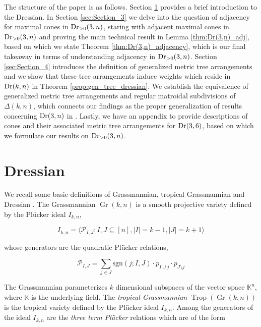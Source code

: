 \documentclass[12pt]{article}
\DeclareMathOperator{\Dr}{\rm Dr}
\DeclareMathOperator{\Trop}{Trop}
\theoremstyle{plain}
\theoremstyle{definition}
\numberwithin{subcase}{case}
\DeclareMathOperator{\Gr}{Gr}
\begin{document}
 
The structure of the paper is as follows. Section \ref{sec:Section_2} provides a brief introduction to the Dressian. In Section \ref{sec:Section_3} we delve into the question of adjacency for maximal cones in $\Dr_{>0}(3,n)$, staring with  adjacent maximal cones in $\Dr_{>0}(3,n)$ and proving the main technical result in Lemma \ref{thm:Dr(3,n)_adj}, based on which we state Theorem \ref{thm:Dr(3,n)_adjacency}, which is our final takeaway in terms of understanding adjacency in $\Dr_{>0}(3,n)$. Section \ref{sec:Section_4} introduces the definition of generalized metric tree arrangements and we show that these tree arrangements induce weights which reside in $\Dr(k,n)$ in Theorem \ref{prop:gen_tree_dressian}. We establish the equivalence of generalized metric tree arrangements and regular matroidal subdivisions of $\Delta(k,n)$, which connects our findings as the proper generalization of results concerning $\Dr(3,n)$ in \cite{herrmann2009draw}. Lastly, we have an appendix to provide descriptions of cones and their associated metric tree arrangements for $\Dr(3,6)$, based on which we formulate our results on $\Dr_{>0}(3,n)$. 


\section{Dressian}\label{sec:Section_2}


We recall some basic definitions of Grassmannian, tropical Grassmannian and Dressian \cite{maclagan2021}.
The Grassmannian $\Gr(k,n)$ is a smooth projective variety defined by the Pl\"ucker ideal $I_{k,n}$,

\[ I _{k,n} = \langle  \mathcal{P}_{I,J} : I,J \subseteq [n], |I| = k-1, |J| = k+1 \rangle  \]

whose generators are the quadratic Pl\"ucker relations,

\[ \mathcal{P}_{I,J} = \sum_{j \in J} \text{sgn}(j;I,J) \cdot p_{I \cup j} \cdot p_{J \setminus j }  \]

The Grassmannian parameterizes $k$ dimensional subspaces of the vector space $\mathbb{K}^{n}$, where $\mathbb{K}$ is the underlying field. The \emph{tropical Grassmannian} $\Trop(\Gr(k,n))$ is the tropical variety defined by the Pl\"ucker ideal $I_{k,n}$. Among the generators of the ideal $I_{k,n}$ are the \emph{three term Pl\"ucker} relations which are of the form
\end{document}
